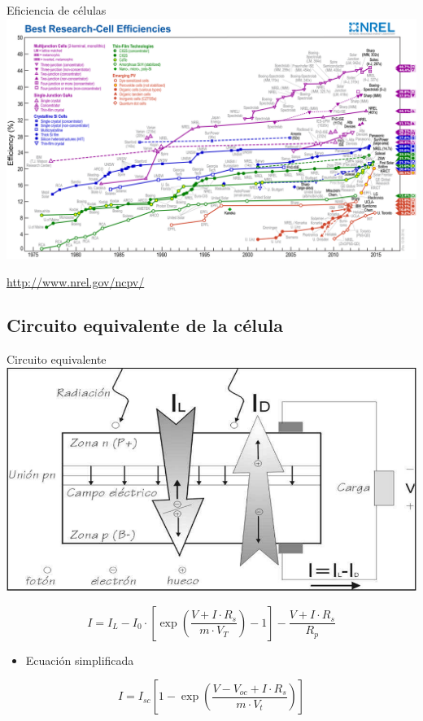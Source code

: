 \documentclass[xcolor={usenames,svgnames,dvipsnames}]{beamer}
\begin{document}
\begin{frame}[label=sec-3-1-6]{Eficiencia de células}
\includegraphics[width=1\textwidth]{../figs/efficiency_chart_nrel.jpg}

\url{http://www.nrel.gov/ncpv/}
\end{frame}

\subsection{Circuito equivalente de la célula}
\label{sec-3-2}

\begin{frame}[label=sec-3-2-1]{Circuito equivalente}
\includegraphics[width=.9\linewidth]{../figs/CelulaSolar.pdf}

$$I=I_{L}-I_{0}\cdot[\exp(\frac{V+I\cdot R_{s}}{m\cdot
  V_{T}})-1]-\frac{V+I\cdot R_{s}}{R_{p}}$$

\begin{itemize}
\item Ecuación simplificada
\end{itemize}

$$I=I_{sc}[1-\exp(\frac{V-V_{oc}+I\cdot R_{s}}{m\cdot V_{t}})]$$
\end{frame}
\end{document}
